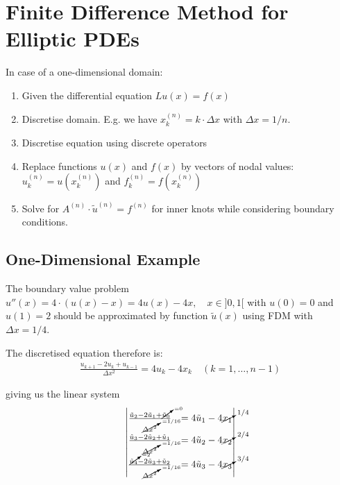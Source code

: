 \section{Finite Difference Method for Elliptic PDEs}

In case of a one-dimensional domain:
\begin{enumerate}
	\item Given the differential equation $Lu(x) = f(x)$
	\item{
		Discretise domain.
		E.g. we have $x_k^{(n)}=k\cdot\Delta x$ with $\Delta x = 1 / n$.
	}
	\item Discretise equation using discrete operators
	\item{
		Replace functions $u(x)$ and $f(x)$ by vectors of nodal values:
		$u_k^{(n)}=u\left(x_k^{(n)}\right)$ and $f_k^{(n)} = f\left(x_k^{(n)}\right)$
	}
	\item Solve for $A^{(n)}\cdot \tilde{u}^{(n)} = f^{(n)}$ for inner knots while considering boundary conditions.
\end{enumerate}

\subsection{One-Dimensional Example}

The boundary value problem $u''(x) = 4\cdot(u(x) - x)=4u(x)-4x,\quad x\in ]0,1[$ with $u(0) = 0$ and $u(1) = 2$
should be approximated by function $\tilde{u}(x)$ using FDM with $\Delta x = 1/4$.

The discretised equation therefore is:
\begin{align*}
	\frac{u_{k+1} - 2u_k + u_{k-1}}{\Delta x^2} = 4u_k - 4x_k\quad(k=1,\ldots,n-1)
\end{align*}


giving us the linear system
\begingroup
\renewcommand*{\arraystretch}{3}
  \begin{align*}
    \left|
    \begin{matrix}
      \frac{\tilde{u}_2 - 2\tilde{u}_1 + \cancelto{=0}{\tilde{u}_0}}{\cancelto{= 1/16}{\Delta x^2}} & = 4\tilde{u}_1 - 4\cancelto{1/4}{x_1} \\
      \frac{\tilde{u}_3 - 2\tilde{u}_2 + \tilde{u}_1}{\cancelto{= 1/16}{\Delta x^2}} & = 4\tilde{u}_2 - 4\cancelto{2/4}{x_2} \\
      \frac{\cancelto{= 2}{\tilde{u}_4} - 2\tilde{u}_3 + \tilde{u}_2}{\cancelto{= 1/16}{\Delta x^2}} & = 4\tilde{u}_3 - 4\cancelto{3/4}{x_3} \\
    \end{matrix}
    \right|
  \end{align*}
\endgroup

